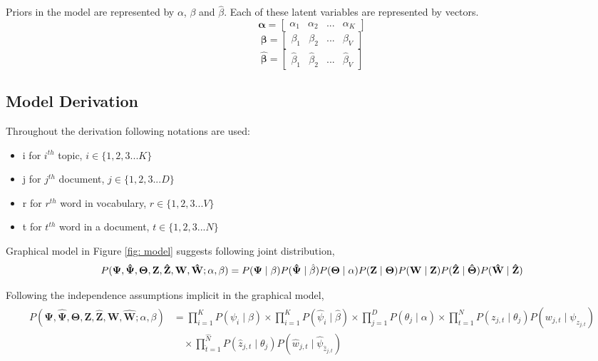 \documentclass[a4paper]{article}
\begin{document}
Priors in the model are represented by $\alpha$, $\beta$ and $\hat{\beta}$. Each of these latent variables are represented by vectors. 
\[
\mathbf{\alpha} = \begin{bmatrix} \alpha_{1} & \alpha_{2} & ... & \alpha_{K} \end{bmatrix}
\]
\[
\mathbf{\beta} = \begin{bmatrix} \beta_{1} & \beta_{2} & ... & \beta_{V} \end{bmatrix}
\]
\[
\mathbf{\hat{\beta}} = \begin{bmatrix} \hat{\beta}_{1} & \hat{\beta}_{2} & ... & \hat{\beta}_{V} \end{bmatrix}
\]


\subsection{Model Derivation} \label{derivation}

Throughout the derivation following notations are used:
\begin{itemize}
\setlength{\itemsep}{0.5pt}
\item i for $i^{th}$ topic, $i \in \{1,2,3 ... K\}$
\item j for $j^{th}$ document, $j \in \{1,2,3 ... D\}$
\item r for $r^{th}$ word in vocabulary, $r \in \{1,2,3 ... V\}$
\item t for $t^{th}$ word in a document, $t \in \{1,2,3 ... N\}$
\end{itemize}

Graphical model in Figure \ref{fig: model} suggests following joint distribution,
\begin{displaymath}
P(\mathbf{\Psi}, \mathbf{\hat{\Psi}}, \mathbf{\Theta},  \mathbf{Z}, \mathbf{\hat{Z}}, \mathbf{W}, \mathbf{\hat{W}} ; \alpha, \beta) = \\
P(\mathbf{\Psi} \mid \beta) P(\mathbf{\hat{\Psi}} \mid \hat{\beta}) P(\mathbf{\Theta} \mid \alpha) P(\mathbf{Z} \mid \mathbf{\Theta})P(\mathbf{W} \mid \mathbf{Z}) P(\mathbf{\hat{Z}} \mid \mathbf{\hat{\Theta}}) P(\mathbf{\hat{W}} \mid \mathbf{\hat{Z}})
\end{displaymath}

Following the independence assumptions implicit in the graphical model,
\begin{align*}
\begin{split}
P(\mathbf{\Psi}, \mathbf{\hat{\Psi}}, \mathbf{\Theta},  \mathbf{Z}, \mathbf{\hat{Z}}, \mathbf{W}, \mathbf{\hat{W}} ; \alpha, \beta)& = 
\prod_{i=1}^{K} P(\psi_{i} \mid \beta) \times \prod_{i=1}^{K} P(\hat{\psi}_{i} \mid \hat{\beta}) \times \prod_{j=1}^{D} P(\theta_{j} \mid \alpha) \times \prod_{t=1}^{N} P(z_{j,t} \mid \theta_{j})P(w_{j,t} \mid \psi_{z_{j,t}}) \\ 
& \quad \times \prod_{\hat{t}=1}^{\hat{N}} P(\hat{z}_{j,t} \mid \theta_{j})P(\hat{w}_{j,t} \mid \hat{\psi}_{\hat{z}_{j,t}})
\end{split}
\end{align*}
\end{document}
